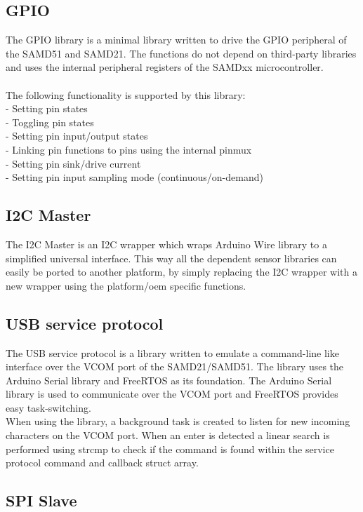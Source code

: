 \subsection{GPIO}
The GPIO library is a minimal library written to drive the GPIO peripheral of the SAMD51 and SAMD21. The functions do not depend on third-party libraries and uses the internal peripheral registers of the SAMDxx microcontroller.\\\\
The following functionality is supported by this library: \\
- Setting pin states \\
- Toggling pin states \\
- Setting pin input/output states \\
- Linking pin functions to pins using the internal pinmux \\
- Setting pin sink/drive current \\
- Setting pin input sampling mode (continuous/on-demand) \\

\subsection{I2C Master}
The I2C Master is an I2C wrapper which wraps Arduino Wire library to a simplified universal interface. This way all the dependent sensor libraries can easily be ported to another platform, by simply replacing the I2C wrapper with a new wrapper using the platform/oem specific functions.
\subsection{USB service protocol}
The USB service protocol is a library written to emulate a command-line like interface over the VCOM port of the SAMD21/SAMD51. The library uses the Arduino Serial library and FreeRTOS as its foundation. The Arduino Serial library is used to communicate over the VCOM port and FreeRTOS provides easy task-switching. \\
When using the library, a background task is created to  listen for new incoming characters on the VCOM port. When an enter is detected a linear search is performed using strcmp to check if the command is found within the service protocol command and callback struct array.
\subsection{SPI Slave}

